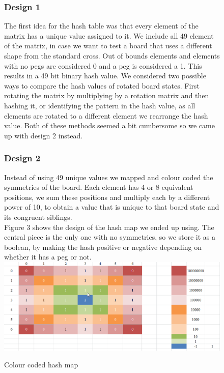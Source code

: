\documentclass[11pt]{article}
\begin{document}
\begin{figure}
\subsubsection*{Design 1}
The first idea for the hash table was that every element of the matrix has a unique value assigned to it. We include all 49 element of the matrix, in case we want to test a board that uses a different shape from the standard cross. Out of bounds elements and elements with no pegs are considered 0 and a peg is considered a 1. This results in a 49 bit binary hash value. We considered two possible ways to compare the hash values of rotated board states. First rotating the matrix by multiplying by a rotation matrix and then hashing it, or identifying the pattern in the hash value, as all elements are rotated to a different element we rearrange the hash value.
Both of these methods seemed a bit cumbersome so we came up with design 2 instead.
\subsubsection*{Design 2}
Instead of using 49 unique values we mapped and colour coded the symmetries of the board. Each element has 4 or 8 equivalent positions, we sum these positions and multiply each by a different power of 10, to obtain a value that is unique to that board state and its congruent siblings.\\
Figure 3 shows the design of the hash map we ended up using. The central piece is the only one with no symmetries, so we store it as a boolean, by making the hash positive or negative depending on whether it has a peg or not.
\newline
\includegraphics[width=\textwidth]{4}
\caption{Colour coded hash map} 
\label{fig: 3}
\end{figure}
\newpage
\end{document}
